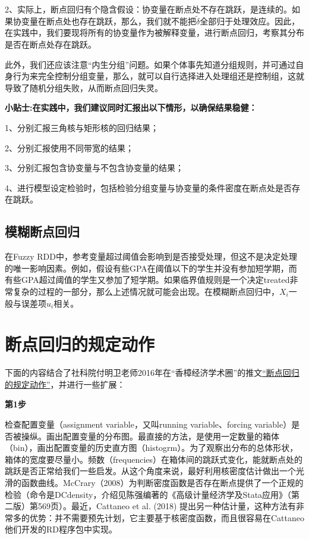 \documentclass[cn,12pt,math=newtx,citestyle=gb7714-2015,bibstyle=gb7714-2015]{elegantbook}
\begin{document}
	2、实际上，断点回归有个隐含假设：协变量在断点处不存在跳跃，是连续的。如果协变量在断点处也存在跳跃，那么，我们就不能把$\tilde{\delta}$全部归于处理效应。因此，在实践中，我们要现将所有的协变量作为被解释变量，进行断点回归，考察其分布是否在断点处存在跳跃。
	
	此外，我们还应该注意“内生分组”问题。如果个体事先知道分组规则，并可通过自身行为来完全控制分组变量，那么，就可以自行选择进入处理组还是控制组，这就导致了随机分组失败，从而断点回归失灵。
	
	\textbf{小贴士:在实践中，我们建议同时汇报出以下情形，以确保结果稳健：}
	
	1、分别汇报三角核与矩形核的回归结果；
	
	2、分别汇报使用不同带宽的结果；
	
	3、分别汇报包含协变量与不包含协变量的结果；
	
	4、进行模型设定检验时，包括检验分组变量与协变量的条件密度在断点处是否存在跳跃。
	
	
	\subsection{模糊断点回归}
	
	在Fuzzy RDD中，参考变量超过阈值会影响到是否接受处理，但这不是决定处理的唯一影响因素。例如，假设有些GPA在阈值以下的学生并没有参加短学期，而有些GPA超过阈值的学生又参加了短学期。如果临界值规则是一个决定treated非常复杂的过程的一部分，那么上述情况就可能会出现。在模糊断点回归中，$X_i$一般与误差项$u_i$相关。
	
	\section{断点回归的规定动作}
	
	下面的内容结合了社科院付明卫老师2016年在“香樟经济学术圈”的推文\href{https://cec.blog.caixin.com/archives/193848}{“断点回归的规定动作”}，并进行一些扩展：
	
	\textbf{第1步}
	
	检查配置变量（assignment variable，又叫running variable、forcing variable）是否被操纵。画出配置变量的分布图。最直接的方法，是使用一定数量的箱体（bin），画出配置变量的历史直方图（histogrm）。为了观察出分布的总体形状，箱体的宽度要尽量小。频数（frequencies）在箱体间的跳跃式变化，能就断点处的跳跃是否正常给我们一些启发。从这个角度来说，最好利用核密度估计做出一个光滑的函数曲线。McCrary（2008）为判断密度函数是否存在断点提供了一个正规的检验（命令是DCdensity，介绍见陈强编著的《高级计量经济学及Stata应用》（第二版）第569页）。最近，Cattaneo et al. (2018) 提出另一种估计量，这种方法有非常多的优势：并不需要预先计划，它主要基于核密度函数，而且很容易在Cattaneo他们开发的RD程序包中实现。
	
\end{document}

